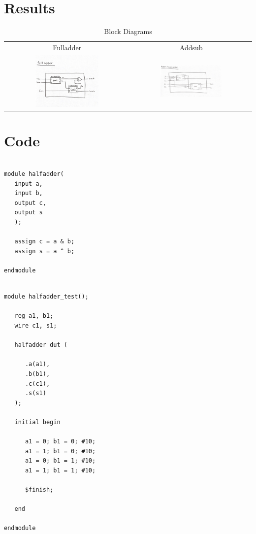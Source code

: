 \documentclass[11pt]{article}
\begin{document}
\section*{Results}

\begin{table}[h]\centering
	\begin{tabular}{cc}
		Fulladder & Addsub \\
		\includegraphics [width=0.53\textwidth,trim=0 0 0 0, clip]{fulladder_blockdiagram} &
		\includegraphics [width=0.53\textwidth,trim=0 0 0 0, clip]{addsub_blockdiagram} \\
	\end{tabular}
	\caption{Block Diagrams}
	\label{fig:sim_with_table}
\end{table}


\section*{Code}

\begin{lstlisting}

module halfadder(
   input a,
   input b,
   output c,
   output s
   );

   assign c = a & b;
   assign s = a ^ b;

endmodule

\end{lstlisting}

\begin{lstlisting}

module halfadder_test();

   reg a1, b1;
   wire c1, s1;

   halfadder dut (

      .a(a1),
      .b(b1),
      .c(c1),
      .s(s1)
   );

   initial begin 

      a1 = 0; b1 = 0; #10;
      a1 = 1; b1 = 0; #10;
      a1 = 0; b1 = 1; #10;
      a1 = 1; b1 = 1; #10;

      $finish;

   end

endmodule

\end{lstlisting}
\end{document}
